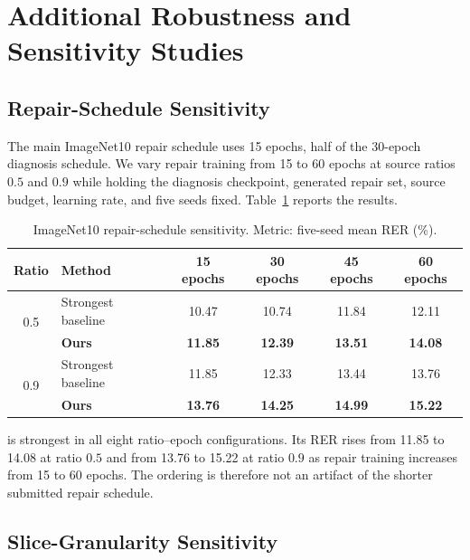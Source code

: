 \section{Additional Robustness and Sensitivity Studies}
\label{app:additional-robustness}

\subsection{Repair-Schedule Sensitivity}

The main ImageNet10 repair schedule uses 15 epochs, half of the 30-epoch diagnosis schedule. We vary repair training from 15 to 60 epochs at source ratios $0.5$ and $0.9$ while holding the diagnosis checkpoint, generated repair set, source budget, learning rate, and five seeds fixed. Table~\ref{tab:repair-schedule-sensitivity} reports the results.

\begin{table}[htbp]
\centering
\caption{ImageNet10 repair-schedule sensitivity. Metric: five-seed mean RER (\%).}
\label{tab:repair-schedule-sensitivity}
\small
\setlength{\tabcolsep}{4pt}
\begin{tabular}{c l c c c c}
\toprule
\rowcolor{sectiongray} \textbf{Ratio} & \textbf{Method} & \textbf{15 epochs} & \textbf{30 epochs} & \textbf{45 epochs} & \textbf{60 epochs} \\
\midrule
\multirow{2}{*}{0.5} & Strongest baseline & 10.47 & 10.74 & 11.84 & 12.11 \\
& \textbf{Ours} & \textbf{11.85} & \textbf{12.39} & \textbf{13.51} & \textbf{14.08} \\
\midrule
\multirow{2}{*}{0.9} & Strongest baseline & 11.85 & 12.33 & 13.44 & 13.76 \\
& \textbf{Ours} & \textbf{13.76} & \textbf{14.25} & \textbf{14.99} & \textbf{15.22} \\
\bottomrule
\end{tabular}
\end{table}

\model is strongest in all eight ratio--epoch configurations. Its RER rises from 11.85 to 14.08 at ratio $0.5$ and from 13.76 to 15.22 at ratio $0.9$ as repair training increases from 15 to 60 epochs. The ordering is therefore not an artifact of the shorter submitted repair schedule.

\subsection{Slice-Granularity Sensitivity}

